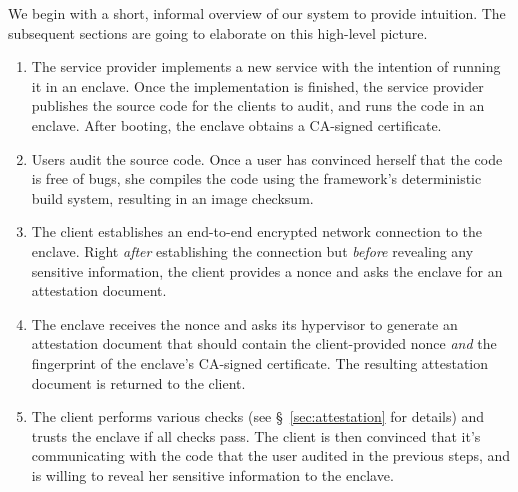 We begin with a short, informal overview of our system to provide intuition.
The subsequent sections are going to elaborate on this high-level picture.  

\begin{enumerate}
    \item The service provider implements a new service with the intention of
      running it in an enclave.  Once the implementation is finished, the
      service provider publishes the source code for the clients to audit, and
      runs the code in an enclave.  After booting, the enclave obtains a
      CA-signed certificate.

    \item Users audit the source code.  Once a user has convinced herself that
      the code is free of bugs, she compiles the code using the framework's
      deterministic build system, resulting in an image checksum.

    \item The client establishes an end-to-end encrypted network connection to
      the enclave.  Right \emph{after} establishing the connection but
      \emph{before} revealing any sensitive information, the client provides a
      nonce and asks the enclave for an attestation document.

    \item The enclave receives the nonce and asks its hypervisor to generate an
      attestation document that should contain the client-provided nonce
      \emph{and} the fingerprint of the enclave's CA-signed certificate.  The
      resulting attestation document is returned to the client.

    \item The client performs various checks (see \S~\ref{sec:attestation} for
      details) and trusts the enclave if all checks pass.  The client is then
      convinced that it's communicating with the code that the user audited in
      the previous steps, and is willing to reveal her sensitive information to
      the enclave.
\end{enumerate}



